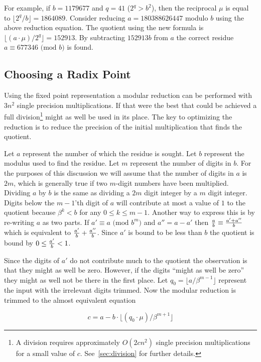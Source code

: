 \documentclass[b5paper]{book}
\begin{document}
For example, if $b = 1179677$ and $q = 41$ ($2^q > b^2$), then the reciprocal $\mu$ is equal to $\lfloor 2^q / b \rfloor = 1864089$.  Consider reducing
$a = 180388626447$ modulo $b$ using the above reduction equation.  The quotient using the new formula is $\lfloor (a \cdot \mu) / 2^q \rfloor = 152913$.
By subtracting $152913b$ from $a$ the correct residue $a \equiv 677346 \mbox{ (mod }b\mbox{)}$ is found.

\subsection{Choosing a Radix Point}
Using the fixed point representation a modular reduction can be performed with $3n^2$ single precision multiplications.  If that were the best
that could be achieved a full division\footnote{A division requires approximately $O(2cn^2)$ single precision multiplications for a small value of $c$.  
See~\ref{sec:division} for further details.} might as well be used in its place.  The key to optimizing the reduction is to reduce the precision of
the initial multiplication that finds the quotient.  

Let $a$ represent the number of which the residue is sought.  Let $b$ represent the modulus used to find the residue.  Let $m$ represent
the number of digits in $b$.  For the purposes of this discussion we will assume that the number of digits in $a$ is $2m$, which is generally true if 
two $m$-digit numbers have been multiplied.  Dividing $a$ by $b$ is the same as dividing a $2m$ digit integer by a $m$ digit integer.  Digits below the 
$m - 1$'th digit of $a$ will contribute at most a value of $1$ to the quotient because $\beta^k < b$ for any $0 \le k \le m - 1$.  Another way to
express this is by re-writing $a$ as two parts.  If $a' \equiv a \mbox{ (mod }b^m\mbox{)}$ and $a'' = a - a'$ then 
${a \over b} \equiv {{a' + a''} \over b}$ which is equivalent to ${a' \over b} + {a'' \over b}$.  Since $a'$ is bound to be less than $b$ the quotient
is bound by $0 \le {a' \over b} < 1$.

Since the digits of $a'$ do not contribute much to the quotient the observation is that they might as well be zero.  However, if the digits 
``might as well be zero'' they might as well not be there in the first place.  Let $q_0 = \lfloor a/\beta^{m-1} \rfloor$ represent the input
with the irrelevant digits trimmed.  Now the modular reduction is trimmed to the almost equivalent equation

\begin{equation}
c = a - b \cdot \lfloor (q_0 \cdot \mu) / \beta^{m+1} \rfloor
\end{equation}
\end{document}
